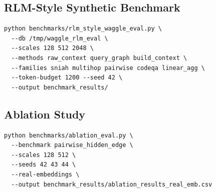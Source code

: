 \documentclass[conference]{IEEEtran}
\begin{document}
\subsection{RLM-Style Synthetic Benchmark}

\begin{verbatim}
python benchmarks/rlm_style_waggle_eval.py \
  --db /tmp/waggle_rlm_eval \
  --scales 128 512 2048 \
  --methods raw_context query_graph build_context \
  --families sniah multihop pairwise codeqa linear_agg \
  --token-budget 1200 --seed 42 \
  --output benchmark_results/
\end{verbatim}

\subsection{Ablation Study}

\begin{verbatim}
python benchmarks/ablation_eval.py \
  --benchmark pairwise_hidden_edge \
  --scales 128 512 \
  --seeds 42 43 44 \
  --real-embeddings \
  --output benchmark_results/ablation_results_real_emb.csv
\end{verbatim}
\end{document}
